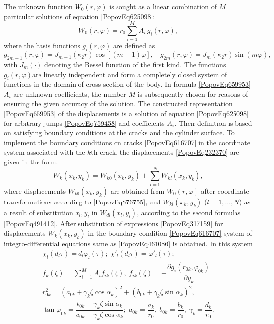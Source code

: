 The unknown function \( W_0(r, \varphi) \) is sought as a linear combination of \( M \) particular solutions of equation \eqref{PopovEq625098}:
\begin{equation}\label{PopovEq659953}
	W_0(r, \varphi) = r_0 \sum_{i=1}^{M} A_i\, g_i(r, \varphi),
\end{equation}
where the basis functions \( g_i(r, \varphi) \) are defined as
\[
g_{2m-1}(r, \varphi) = J_{m-1}(\kappa_2 r)\cos[(m - 1)\varphi], \quad
g_{2m}(r, \varphi) = J_m(\kappa_2 r)\sin(m \varphi),
\]
with \( J_m(\cdot) \) denoting the Bessel function of the first kind. The functions $g_{i} \left(r,\varphi \right)$are linearly independent and form a completely closed system of functions in the domain of cross section \cite{Popov24} of the body. In formula \eqref{PopovEq659953} $A_{i} $ are unknown coefficients, the number $M$ is subsequently chosen for reasons of ensuring the given accuracy of the solution. The constructed representation \eqref{PopovEq659953} of the displacements is a solution of equation \eqref{PopovEq625098} for arbitrary jumps \eqref{PopovEq759458} and coefficients $A_{i} $. Their definition is based on satisfying boundary conditions at the cracks and the cylinder surface. To implement the boundary conditions on cracks \eqref{PopovEq616707} in the coordinate system associated with the $k$th crack, the displacements \eqref{PopovEq232370} are given in the form:
\begin{equation} \label{PopovEq317159} 
	W_{k} \left(x_{k} ,y_{k} \right)=W_{k0} \left(x_{k} ,y_{k} \right)+\sum _{l=1}^{N}W_{kl} \left(x_{k} ,y_{k} \right) , 
\end{equation} 
where displacements $W_{k0} \left(x_{k} ,y_{k} \right)$ are obtained from $W_{0} \left(r,\varphi \right)$ after coordinate transformations according to \eqref{PopovEq876755}, and $W_{kl} \left(x_{k} ,y_{k} \right)$ ($l=1,\dots,N$) as a result of substitution $x_{l} ,y_{l} $ in $W_{dl} \left(x_{l} ,y_{l} \right)$, according to the second formulas \eqref{PopovEq491412}. After substitution of expressions \eqref{PopovEq317159} for displacements $W_{k} \left(x_{k} ,y_{k} \right)$ in the boundary condition \eqref{PopovEq616707} system of integro-differential equations same as \eqref{PopovEq461086} is obtained. In this system
\begin{equation} \label{PopovEq793073} 
	\begin{array}{l} 
		\chi _{l} \left(d_{l} \tau \right)=d_{l} \varphi _{l} \left(\tau \right);\; \chi '_{l} \left(d_{l} \tau \right)=\varphi '_{l} \left(\tau \right); 
		\\
		f_{k} (\zeta )=\displaystyle\sum _{i=1}^{M}A_{i} f{}_{ik}  (\zeta ),\; f_{ik} (\zeta )=-\dfrac{\partial g_{i} (r_{0k} ,\varphi _{0k} )}{\partial y_{k} } 
		\\
		r_{0k}^{2} =(a_{0k} +\gamma _{k} \zeta \cos \alpha _{k} )^{2} +(b_{0k} +\gamma _{k} \zeta \sin \alpha _{k} )^{2} ,
		\\
		\tan\varphi _{0k} =\dfrac{b_{0k} +\gamma _{k} \zeta \sin \alpha _{k} }{a_{0k} +\gamma _{k} \zeta \cos \alpha _{k} } ;\; a_{0k} =\dfrac{a_{k} }{r_{0} } ,\; b_{0k} =\dfrac{b_{k} }{r_{0} } ,\;\gamma _{k} =\dfrac{d_{k} }{r_{0} } .
	\end{array} 
\end{equation} 
